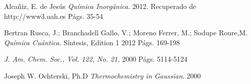 \begin{thebibliography}{9}
Alcañiz, E. de Jesús  
\textit{Química Inorgánica}. 
2012. 
Recuperado de http://www3.uah.es Págs. 35-54

Bertran Rusca, J.; Branchadell Gallo, V.; Moreno Ferrer, M.; Sodupe Roure,M.  
\textit{Química Cuántica}. Síntesis, Edition 1
2012 Págs. 169-198

\textit{J. Am. Chem. Soc., Vol. 122, No. 21, }
2000 Págs. 5114-5124

Joseph W. Ochterski, Ph.D
\textit{Thermochemistry in Gaussian}.
2000

\end{thebibliography}